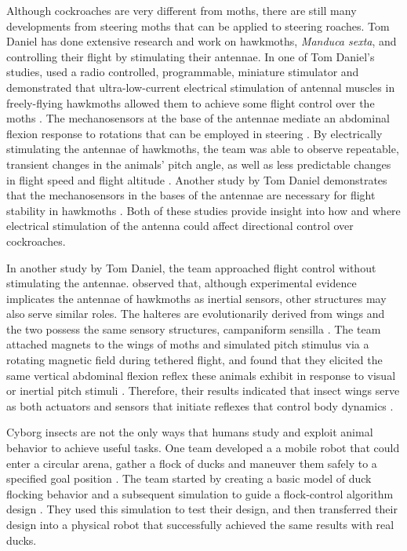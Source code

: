 Although cockroaches are very different from moths, there are still many developments from steering moths that can be applied to steering roaches. Tom Daniel has done extensive research and work on hawkmoths, \textit{Manduca sexta}, and controlling their flight by stimulating their antennae. In one of Tom Daniel's studies, \citet{wireless} used a radio controlled, programmable, miniature stimulator and demonstrated that ultra-low-current electrical stimulation of antennal muscles in freely-flying hawkmoths allowed them to achieve some flight control over the moths \citep{wireless}. The mechanosensors at the base of the antennae mediate an abdominal flexion response to rotations that can be employed in steering \citep{wireless}. By electrically stimulating the antennae of hawkmoths, the team was able to observe repeatable, transient changes in the animals’ pitch angle, as well as less predictable changes in flight speed and flight altitude \citep{wireless}. Another study by Tom Daniel demonstrates that the mechanosensors in the bases of the antennae are necessary for flight stability in hawkmoths \citet{antennal}. Both of these studies provide insight into how and where electrical stimulation of the antenna could affect directional control over cockroaches.

In another study by Tom Daniel, the team approached flight control without stimulating the antennae. \citet{Dickerson2014}
observed that, although experimental evidence implicates the antennae of hawkmoths as inertial sensors, other structures may also serve similar roles. The halteres are evolutionarily derived from wings and the two possess the same sensory structures, campaniform sensilla \citep{Dickerson2014}. The team attached magnets to the wings of moths and simulated pitch stimulus via a rotating magnetic field during tethered flight, and found that they elicited the same vertical abdominal flexion reflex these animals exhibit in response to visual or inertial pitch stimuli \citep{Dickerson2014}. Therefore, their results indicated that insect wings serve as both actuators and sensors that initiate reflexes that control body dynamics \citep{Dickerson2014}.

Cyborg insects are not the only ways that humans study and exploit animal behavior to achieve useful tasks. One team developed a a mobile robot that could enter a circular arena, gather a flock of ducks and maneuver them safely to a specified goal position \citep{robot}. The team started by creating a basic model of duck flocking behavior and a subsequent simulation to guide a flock-control algorithm design \citep{robot}. They used this simulation to test their design, and then transferred their design into a physical robot that successfully achieved the same results with real ducks\citep{robot}.

